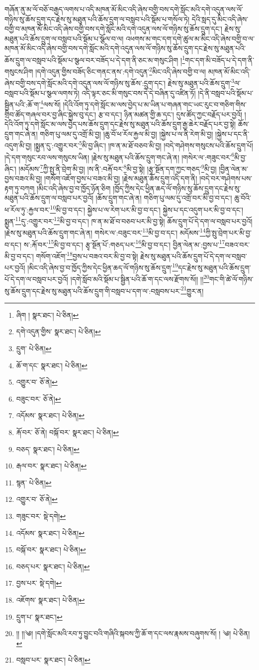 གཞོན་ནུ་མ་ལོ་བཅོ་བརྒྱད་ལགས་པ་འདི་མཁན་མོ་མིང་འདི་ཞེས་བགྱི་བས་དགེ་སློང་མའི་དགེ་འདུན་ལས་ལོ་གཉིས་སུ་ཆོས་དྲུག་དང་རྗེས་སུ་མཐུན་པའི་ཆོས་དྲུག་ལ་བསླབ་པའི་སྡོམ་པ་གསོལ་ཏེ། དེའི་སླད་དུ་མིང་འདི་ཞེས་བགྱི་བ་མཁན་མོ་མིང་འདི་ཞེས་བགྱི་བས་དགེ་སློང་མའི་དགེ་འདུན་ལས་ལོ་གཉིས་སུ་ཆོས་དྲུག་དང་། རྗེས་སུ་མཐུན་པའི་ཆོས་དྲུག་ལ་བསླབ་པའི་སྡོམ་པ་སྩོལ་བ་ལ། འཕགས་མ་གང་དག་དགེ་ཚུལ་མ་མིང་འདི་ཞེས་བགྱི་བ་ལ་མཁན་མོ་མིང་འདི་ཞེས་བགྱི་བས་དགེ་སློང་མའི་དགེ་འདུན་ལས་ལོ་གཉིས་སུ་ཆོས་དྲུག་དང་རྗེས་སུ་མཐུན་པའི་ཆོས་དྲུག་ལ་བསླབ་པའི་སྡོམ་པ་སྩལ་བར་བཟོད་པ་དེ་དག་ནི་ཅང་མ་གསུང་ཤིག །\footnote{ཞིག །  སྣར་ཐང་།  པེ་ཅིན། }གང་དག་མི་བཟོད་པ་དེ་དག་ནི་གསུངས་ཤིག །དགེ་འདུན་གྱིས་བཟོད་ཅིང་གནང་ནས་:དགེ་འདུན་\footnote{དགེ་འདུན་གྱིས་  སྣར་ཐང་།  པེ་ཅིན། }མིང་འདི་ཞེས་བགྱི་བ་ལ། མཁན་མོ་མིང་འདི་ཞེས་བགྱི་བས་དགེ་སློང་མའི་དགེ་འདུན་ལས་ལོ་གཉིས་སུ་ཆོས་:དྲུག་དང་། རྗེས་སུ་མཐུན་པའི་ཆོས་དྲུག་\footnote{དྲུག་  པེ་ཅིན། }ལ་བསླབ་པའི་སྡོམ་པ་སྩལ་ལགས་ཏེ། འདི་ལྟར་ཅང་མི་གསུང་བས་དེ་དེ་བཞིན་དུ་འཛིན་ཏོ། །དེ་ནི་བསླབ་པའི་སྡོམ་པ་སྦྱིན་པའི་:ཆོ་ག་\footnote{ཆོ་ག་དང་  སྣར་ཐང་།  པེ་ཅིན། }ལས་སོ། །དེའི་འོག་ཏུ་དགེ་སློང་མ་ལས་བྱེད་པ་མ་ཡིན་པ་གཞན་གང་ཡང་རུང་བ་གཅིག་གིས་གྲིབ་ཚོད་གཞལ་བར་བྱ་ཞིང་སྐྱེས་བུ་དང་། རྩ་བ་དང་། ཉིན་མཚན་གྱི་ཆ་དང་། དུས་ཚོད་ཀྱང་བརྗོད་པར་བྱའོ། །དེའི་འོག་ཏུ་དགེ་སློང་མ་ལས་བྱེད་པས་ཆོས་དྲུག་དང་རྗེས་སུ་མཐུན་པའི་ཆོས་དྲུག་རྒྱ་ཆེར་བརྗོད་པར་བྱ་སྟེ། ཆོས་དྲུག་གང་ཞེ་ན། གཅིག་པུ་ལམ་དུ་འགྲོ་མི་བྱ། །ཆུ་བོ་ཕ་རོལ་རྐྱལ་མི་བྱ། །སྐྱེས་པ་ལ་ནི་རེག་མི་བྱ། །སྐྱེས་པ་དང་ནི་འདུག་མི་བྱ། །སྨྱན་དུ་:འགྱུར་བར་\footnote{འགྱུར་བ་  ཅོ་ནེ། }མི་བྱ་ཞིང་། །ཁ་ན་མ་ཐོ་བཅབ་མི་བྱ། །བདེ་གཤེགས་གསུངས་པའི་ཆོས་དྲུག་པོ། །དེ་དག་གསུང་རབ་ལས་གསུངས་ཡིན། །རྗེས་སུ་མཐུན་པའི་ཆོས་དྲུག་གང་ཞེ་ན། །གསེར་ལ་:གཟུང་བར་\footnote{བཟུང་བར་  ཅོ་ནེ། }མི་བྱ་ཞིང་། །མདོམས་\footnote{འདོམས་  སྣར་ཐང་།  པེ་ཅིན། }ཀྱི་སྤུ་ནི་བྲེག་མི་བྱ། །ས་ནི་:བརྐོ་བར་\footnote{རྐོ་བར་  ཅོ་ནེ། བསྐོ་བར་  སྣར་ཐང་།  པེ་ཅིན། }མི་བྱ་སྟེ། །རྩྭ་སྔོན་དག་ཀྱང་གཅད་\footnote{བཅད་  སྣར་ཐང་།  པེ་ཅིན། }མི་བྱ། །བྱིན་ལེན་མ་བྱས་བཟའ་མི་བྱ། །གསོག་འཇོག་བྱས་པ་བཟའ་མི་བྱ། །རྗེས་མཐུན་ཆོས་དྲུག་འདི་དག་ནི། །བདེ་བར་གཤེགས་པས་རྟག་ཏུ་བཀག །མིང་འདི་ཞེས་བྱ་བ་ཁྱོད་ཉོན་ཅིག །ཁྱོད་ཀྱིས་དེང་ཕྱིན་ཆད་ལོ་གཉིས་སུ་ཆོས་དྲུག་དང་རྗེས་སུ་མཐུན་པའི་ཆོས་དྲུག་ལ་བསླབ་པར་བྱའོ། །ཆོས་དྲུག་གང་ཞེ་ན། གཅིག་པུ་ལམ་དུ་འགྲོ་བར་མི་བྱ་བ་དང་། ཆུ་བོའི་ཕ་རོལ་ཏུ་:རྐྱལ་བར་\footnote{རྒལ་བར་  སྣར་ཐང་།  པེ་ཅིན། }མི་བྱ་བ་དང་། སྐྱེས་པ་ལ་རེག་པར་མི་བྱ་བ་དང་། སྐྱེས་པ་དང་འདུག་པར་མི་བྱ་བ་དང་། སྨྱན་\footnote{སྙན་  པེ་ཅིན། }དུ་:འགྱུར་བར་\footnote{འགྱུར་བ་  ཅོ་ནེ། }མི་བྱ་བ་དང་། ཁ་ན་མ་ཐོ་བ་བཅབ་པར་མི་བྱ་སྟེ། ཆོས་དྲུག་པོ་དེ་དག་ལ་བསླབ་པར་བྱའོ། །རྗེས་སུ་མཐུན་པའི་ཆོས་དྲུག་གང་ཞེ་ན། གསེར་ལ་:བཟུང་བར་\footnote{གཟུང་བར་  སྡེ་དགེ། }མི་བྱ་བ་དང་། མདོམས་\footnote{འདོམས་  སྣར་ཐང་།  པེ་ཅིན། }ཀྱི་སྤུ་བྲེག་པར་མི་བྱ་བ་དང་། ས་:རྐོ་བར་\footnote{བསྐོ་བར་  སྣར་ཐང་།  པེ་ཅིན། }མི་བྱ་བ་དང་། རྩྭ་སྔོན་པོ་:གཅད་པར་\footnote{བཅད་པར་  སྣར་ཐང་།  པེ་ཅིན། }མི་བྱ་བ་དང་། བྱིན་ལེན་མ་:བྱས་པ་\footnote{བྱས་པར་  སྡེ་དགེ། }བཟའ་བར་མི་བྱ་བ་དང་། གསོག་འཇོག་\footnote{འཇོགས་  སྣར་ཐང་།  པེ་ཅིན། }བྱས་པ་བཟའ་བར་མི་བྱ་བ་སྟེ། རྗེས་སུ་མཐུན་པའི་ཆོས་དྲུག་པོ་དེ་དག་ལ་བསླབ་པར་བྱའོ། །མིང་འདི་ཞེས་བྱ་བ་ཁྱོད་ཀྱིས་དེང་ཕྱིན་ཆད་ལོ་གཉིས་སུ་ཆོས་དྲུག་\footnote{དྲུག་པ་  སྣར་ཐང་། }དང་རྗེས་སུ་མཐུན་པའི་ཆོས་དྲུག་པོ་དེ་དག་ལ་བསླབ་པར་བྱའོ། །དགེ་སློབ་མའི་སྡོམ་པ་སྦྱིན་པའི་ཆོ་ག་དང་ལས་རྫོགས་སོ།། །།\footnote{།། །།༄། །དགེ་སློང་མའི་རབ་ཏུ་བྱུང་བའི་གཞིའི་སྐབས་ཀྱི་ཆོ་ག་དང་ལས་རྣམས་བཞུགས་སོ། ། ༄།   པེ་ཅིན། }གང་གི་ཚེ་ལོ་གཉིས་སུ་ཆོས་དྲུག་དང་རྗེས་སུ་མཐུན་པའི་ཆོས་དྲུག་གི་བསླབ་པ་དག་ལ་:བསླབས་པར་\footnote{བསླབ་པར་  སྣར་ཐང་།  པེ་ཅིན། }གྱུར་ན། 